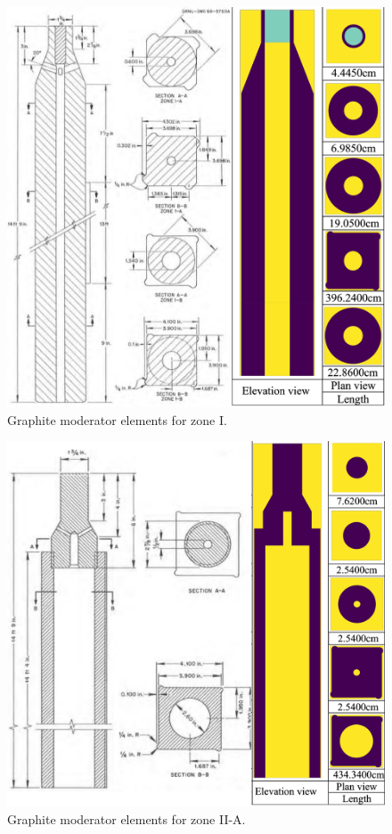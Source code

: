 \documentclass[review]{elsarticle}
\begin{document}
\begin{figure}[htbp!]
    \begin{center}
        \includegraphics[width=\textwidth]{zone_I_element_ref.png}
    \end{center}
    \caption{Graphite moderator elements for zone I.}
  	\label{fig:I_element_ref}
\end{figure}
\begin{figure}[htbp!]
    \begin{center}
		\includegraphics[width=\textwidth]{zone_II_element_ref.png}
    \end{center}
	\caption{Graphite moderator elements for zone II-A.}
	\label{fig:II_element_ref}
\end{figure}
\end{document}

